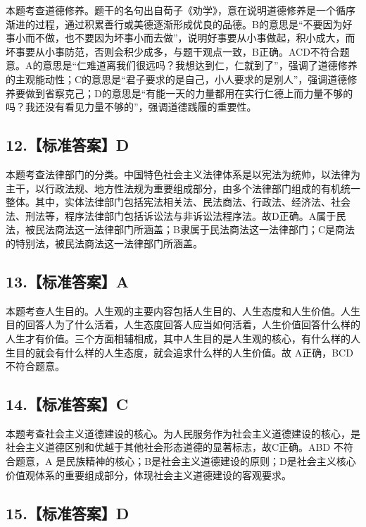 \documentclass[UTF8,11pt]{ctexart}
\begin{document}
本题考查道德修养。题干的名句出自荀子《劝学》，意在说明道德修养是一个循序渐进的过程，通过积累善行或美德逐渐形成优良的品德。B的意思是“不要因为好事小而不做，也不要因为坏事小而去做”，说明好事要从小事做起，积小成大，而坏事要从小事防范，否则会积少成多，与题干观点一致，B正确。ACD不符合题意。A的意思是“仁难道离我们很远吗？我想达到仁，仁就到了”，强调了道德修养的主观能动性；C的意思是“君子要求的是自己，小人要求的是别人”，强调道德修养要做到省察克己；D的意思是“有能一天的力量都用在实行仁德上而力量不够的吗？我还没有看见力量不够的”，强调道德践履的重要性。


\subsection*{12.【标准答案】D}

本题考查法律部门的分类。中国特色社会主义法律体系是以宪法为统帅，以法律为主干，以行政法规、地方性法规为重要组成部分，由多个法律部门组成的有机统一整体。其中，实体法律部门包括宪法相关法、民法商法、行政法、经济法、社会法、刑法等，程序法律部门包括诉讼法与非诉讼法程序法。故D正确。A属于民法，被民法商法这一法律部门所涵盖；B隶属于民法商法这一法律部门；C是商法的特别法，被民法商法这一法律部门所涵盖。


\subsection*{13.【标准答案】A}

本题考查人生目的。人生观的主要内容包括人生目的、人生态度和人生价值。人生目的回答人为了什么活着，人生态度回答人应当如何活着，人生价值回答什么样的人生才有价值。三个方面相辅相成，其中人生目的是人生观的核心，有什么样的人生目的就会有什么样的人生态度，就会追求什么样的人生价值。故 A正确，BCD 不符合题意。


\subsection*{14.【标准答案】C}

本题考查社会主义道德建设的核心。为人民服务作为社会主义道德建设的核心，是社会主义道德区别和优越于其他社会形态道德的显著标志，故C正确。ABD 不符合题意，A 是民族精神的核心；B是社会主义道德建设的原则；D是社会主义核心价值观体系的重要组成部分，体现社会主义道德建设的客观要求。


\subsection*{15.【标准答案】D}
\end{document}
